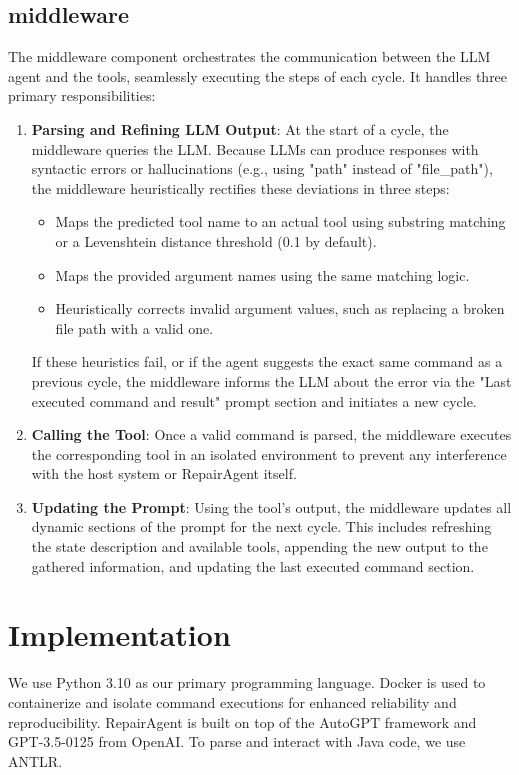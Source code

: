 \documentclass[manuscript,review]{acmart}
\begin{document}
\subsection{middleware}
The middleware component orchestrates the communication between the LLM agent and the tools, seamlessly executing the steps of each cycle. It handles three primary responsibilities:

\begin{enumerate}
  \item \textbf{Parsing and Refining LLM Output}: At the start of a cycle, the middleware queries the LLM. Because LLMs can produce responses with syntactic errors or hallucinations (e.g., using "path" instead of "file\_path"), the middleware heuristically rectifies these deviations in three steps:
  \begin{itemize}
    \item Maps the predicted tool name to an actual tool using substring matching or a Levenshtein distance threshold (0.1 by default).
    \item Maps the provided argument names using the same matching logic.
    \item Heuristically corrects invalid argument values, such as replacing a broken file path with a valid one.
  \end{itemize}
  If these heuristics fail, or if the agent suggests the exact same command as a previous cycle, the middleware informs the LLM about the error via the "Last executed command and result" prompt section and initiates a new cycle.
  \item \textbf{Calling the Tool}: Once a valid command is parsed, the middleware executes the corresponding tool in an isolated environment to prevent any interference with the host system or RepairAgent itself.
  \item \textbf{Updating the Prompt}: Using the tool's output, the middleware updates all dynamic sections of the prompt for the next cycle. This includes refreshing the state description and available tools, appending the new output to the gathered information, and updating the last executed command section.

\end{enumerate}

\section{Implementation}
We use Python 3.10 as our primary programming language. Docker is used to containerize and isolate command executions for enhanced reliability and reproducibility. RepairAgent is built on top of the AutoGPT framework and GPT-3.5-0125 from OpenAI. To parse and interact with Java code, we use ANTLR.
\end{document}
